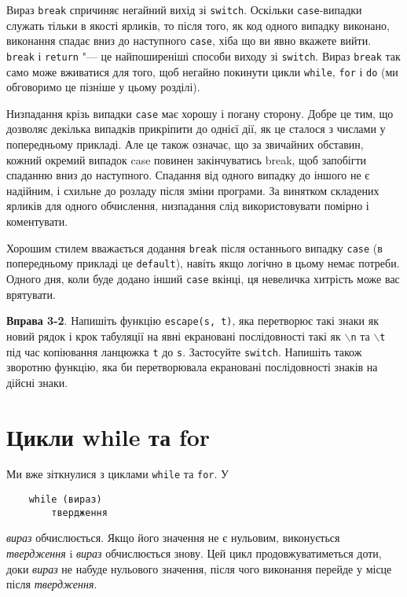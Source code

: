 \documentclass[a4paper,12pt]{book}
\begin{document}
  Вираз \texttt{break} спричиняє негайний вихід зі \texttt{switch}. Оскільки
  \texttt{case}-випадки служать тільки в якості ярликів, то після того, як код одного
  випадку виконано, виконання спадає вниз до наступного \texttt{case}, хіба що ви явно
  вкажете вийти. \texttt{break} і \texttt{return} "--- це найпоширеніші способи виходу
  зі \texttt{switch}. Вираз \texttt{break} так само може вживатися для того, щоб негайно
  покинути цикли \texttt{while}, \texttt{for} і \texttt{do} (ми обговоримо це пізніше у
  цьому розділі).

  Низпадання крізь випадки \texttt{case} має хорошу і погану сторону. Добре це тим, що
  дозволяє декілька випадків прикріпити до однієї дії, як це сталося з числами у
  попередньому прикладі. Але це також означає, що за звичайних обставин, кожний окремий
  випадок case повинен закінчуватись break, щоб запобігти спаданню вниз до наступного.
  Спадання від одного випадку до іншого не є надійним, і схильне до розладу після зміни
  програми. За винятком складених ярликів для одного обчислення, низпадання слід
  використовувати помірно і коментувати.

  Хорошим стилем вважається додання \texttt{break} після останнього випадку \texttt{case}
  (в попередньому прикладі це \texttt{default}), навіть якщо логічно в цьому немає
  потреби. Одного дня, коли буде додано інший \texttt{case} вкінці, ця невеличка хитрість
  може вас врятувати.

  \textbf{Вправа 3-2}. Напишіть функцію \texttt{escape(s, t)}, яка перетворює такі знаки як
  новий рядок і крок табуляції на явні екрановані послідовності такі як \texttt{\mbox{$\backslash$}n} та
  \texttt{\mbox{$\backslash$}t} під час копіювання ланцюжка \texttt{t} до \texttt{s}. Застосуйте
  \texttt{switch}. Напишіть також зворотню функцію, яка би перетворювала екрановані
  послідовності знаків на дійсні знаки.

\section{Цикли while та for}


  Ми вже зіткнулися з циклами \texttt{while} та \texttt{for}. У
  \begin{verbatim}
    while (вираз)
        твердження
  \end{verbatim}
  \textit{вираз} обчислюється. Якщо його значення не є нульовим, виконується
  \textit{твердження} i \textit{вираз} обчислюється знову. Цей цикл продовжуватиметься доти,
  доки \textit{вираз} не набуде нульового значення, після чого виконання перейде у місце
  після \textit{твердження}.
\end{document}
